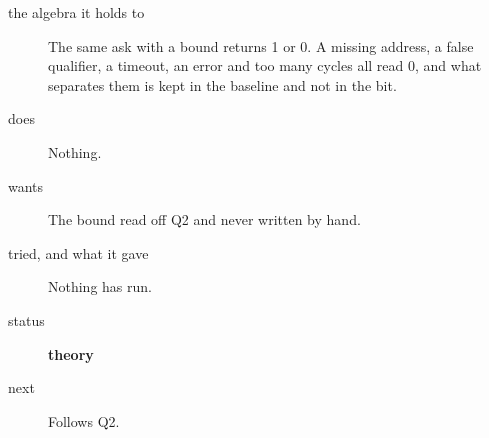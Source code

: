 \begin{description}
\item[{the algebra it holds to}] The same ask with a bound returns 1 or 0. A missing address, a false qualifier, a timeout, an error and too many cycles all read 0, and what separates them is kept in the baseline and not in the bit.
\item[{does}] Nothing.
\item[{wants}] The bound read off Q2 and never written by hand.
\item[{tried, and what it gave}] Nothing has run.
\item[{status}] \textbf{theory}
\item[{next}] Follows Q2.
\end{description}

